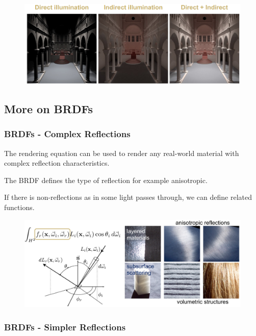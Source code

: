 \documentclass{article}
\begin{document}
\begin{figure}[!ht]
    \centering
    \includegraphics[width=0.9\linewidth]{images/illumination_comparision.png}
\end{figure}

\subsection{More on BRDFs}

\subsubsection{BRDFs - Complex Reflections}

The rendering equation can be used to render any real-world material with complex reflection characteristics.

\vspace{5px} 

The BRDF defines the type of reflection for example anisotropic.

\vspace{5px}

If there is non-reflections as in some light passes through, we can define related functions.

\begin{figure}[!ht]
    \centering
    \includegraphics[width=0.8\linewidth]{images/complex_brdfs.png}
\end{figure}

\subsubsection{BRDFs - Simpler Reflections}
\end{document}
